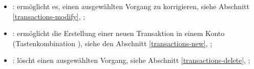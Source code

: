 \vspace{3mm}
\noindent
\begin{minipage}{.7\linewidth}
	\begin{itemize}[rightmargin=.6cm]
		\item {}: ermöglicht es, einen ausgewählten Vorgang zu korrigieren, siehe Abschnitt \vref{transactions-modify}, ;%
		\item {}: ermöglicht die Erstellung einer neuen Transaktion in einem Konto (Tastenkombination ), siehe den Abschnitt \vref{transactions-new}, ;%
		\item {}: löscht einen ausgewählten Vorgang, siehe Abschnitt \vref{transactions-delete}, ;%
	\end{itemize}
\end{minipage}
\hspace{10pt}	
